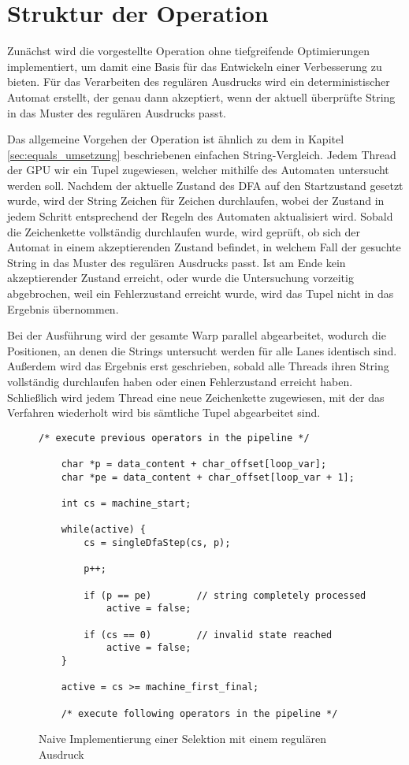 
\section{Struktur der Operation}

Zunächst wird die vorgestellte Operation ohne tiefgreifende Optimierungen implementiert, um damit eine Basis für das Entwickeln einer Verbesserung zu bieten.
Für das Verarbeiten des regulären Ausdrucks wird ein deterministischer Automat erstellt, der genau dann akzeptiert, wenn der aktuell überprüfte String in das Muster des regulären Ausdrucks passt.

Das allgemeine Vorgehen der Operation ist ähnlich zu dem in Kapitel \ref{sec:equals_umsetzung} beschriebenen einfachen String-Vergleich.
Jedem Thread der GPU wir ein Tupel zugewiesen, welcher mithilfe des Automaten untersucht werden soll.
Nachdem der aktuelle Zustand des DFA auf den Startzustand gesetzt wurde, wird der String Zeichen für Zeichen durchlaufen, wobei der Zustand in jedem Schritt entsprechend der Regeln des Automaten aktualisiert wird.
Sobald die Zeichenkette vollständig durchlaufen wurde, wird geprüft, ob sich der Automat in einem akzeptierenden Zustand befindet, in welchem Fall der gesuchte String in das Muster des regulären Ausdrucks passt.
Ist am Ende kein akzeptierender Zustand erreicht, oder wurde die Untersuchung vorzeitig abgebrochen, weil ein Fehlerzustand erreicht wurde, wird das Tupel nicht in das Ergebnis übernommen.

Bei der Ausführung wird der gesamte Warp parallel abgearbeitet, wodurch die Positionen, an denen die Strings untersucht werden für alle Lanes identisch sind.
Außerdem wird das Ergebnis erst geschrieben, sobald alle Threads ihren String vollständig durchlaufen haben oder einen Fehlerzustand erreicht haben.
Schließlich wird jedem Thread eine neue Zeichenkette zugewiesen, mit der das Verfahren wiederholt wird bis sämtliche Tupel abgearbeitet sind.

\newpage

\begin{figure}[ht]
	\begin{lstlisting}[language=MyC++]
	/* execute previous operators in the pipeline */
	
	char *p = data_content + char_offset[loop_var];
	char *pe = data_content + char_offset[loop_var + 1];
	
	int cs = machine_start;
	
	while(active) {
		cs = singleDfaStep(cs, p);
		
		p++;
		
		if (p == pe)		// string completely processed
			active = false;
		
		if (cs == 0)		// invalid state reached
			active = false;
	}
	
	active = cs >= machine_first_final;
	
	/* execute following operators in the pipeline */
	\end{lstlisting}
	\caption{Naive Implementierung einer Selektion mit einem regulären Ausdruck}
	\label{naive_regex}
\end{figure}

